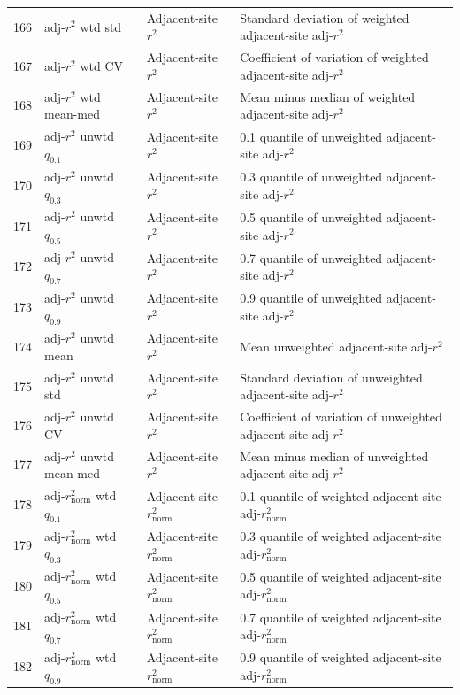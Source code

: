 \begin{longtable}{@{}rllp{7.5cm}@{}}
166 & adj-$r^2$ wtd std & Adjacent-site $r^2$ & Standard deviation of weighted adjacent-site adj-$r^2$ \\
167 & adj-$r^2$ wtd CV & Adjacent-site $r^2$ & Coefficient of variation of weighted adjacent-site adj-$r^2$ \\
168 & adj-$r^2$ wtd mean-med & Adjacent-site $r^2$ & Mean minus median of weighted adjacent-site adj-$r^2$ \\
169 & adj-$r^2$ unwtd $q_{0.1}$ & Adjacent-site $r^2$ & 0.1 quantile of unweighted adjacent-site adj-$r^2$ \\
170 & adj-$r^2$ unwtd $q_{0.3}$ & Adjacent-site $r^2$ & 0.3 quantile of unweighted adjacent-site adj-$r^2$ \\
171 & adj-$r^2$ unwtd $q_{0.5}$ & Adjacent-site $r^2$ & 0.5 quantile of unweighted adjacent-site adj-$r^2$ \\
172 & adj-$r^2$ unwtd $q_{0.7}$ & Adjacent-site $r^2$ & 0.7 quantile of unweighted adjacent-site adj-$r^2$ \\
173 & adj-$r^2$ unwtd $q_{0.9}$ & Adjacent-site $r^2$ & 0.9 quantile of unweighted adjacent-site adj-$r^2$ \\
174 & adj-$r^2$ unwtd mean & Adjacent-site $r^2$ & Mean unweighted adjacent-site adj-$r^2$ \\
175 & adj-$r^2$ unwtd std & Adjacent-site $r^2$ & Standard deviation of unweighted adjacent-site adj-$r^2$ \\
176 & adj-$r^2$ unwtd CV & Adjacent-site $r^2$ & Coefficient of variation of unweighted adjacent-site adj-$r^2$ \\
177 & adj-$r^2$ unwtd mean-med & Adjacent-site $r^2$ & Mean minus median of unweighted adjacent-site adj-$r^2$ \\
\midrule
178 & adj-$r^2_\mathrm{norm}$ wtd $q_{0.1}$ & Adjacent-site $r^2_\mathrm{norm}$ & 0.1 quantile of weighted adjacent-site adj-$r^2_\mathrm{norm}$ \\
179 & adj-$r^2_\mathrm{norm}$ wtd $q_{0.3}$ & Adjacent-site $r^2_\mathrm{norm}$ & 0.3 quantile of weighted adjacent-site adj-$r^2_\mathrm{norm}$ \\
180 & adj-$r^2_\mathrm{norm}$ wtd $q_{0.5}$ & Adjacent-site $r^2_\mathrm{norm}$ & 0.5 quantile of weighted adjacent-site adj-$r^2_\mathrm{norm}$ \\
181 & adj-$r^2_\mathrm{norm}$ wtd $q_{0.7}$ & Adjacent-site $r^2_\mathrm{norm}$ & 0.7 quantile of weighted adjacent-site adj-$r^2_\mathrm{norm}$ \\
182 & adj-$r^2_\mathrm{norm}$ wtd $q_{0.9}$ & Adjacent-site $r^2_\mathrm{norm}$ & 0.9 quantile of weighted adjacent-site adj-$r^2_\mathrm{norm}$ \\

\end{longtable}
